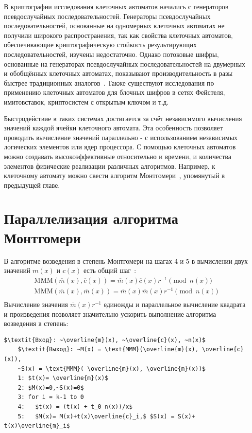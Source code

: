 \documentclass[times,specification,annotation]{itmo-student-thesis}
\begin{document}
В криптографии исследования клеточных автоматов начались с генераторов псевдослучайных последовательностей.
Генераторы псевдослучайных последовательностей, основанные на одномерных клеточных автоматах не получили широкого распространения,
так как свойства клеточных автоматов, обеспечивающие криптографическую стойкость результирующих последовательностей,
изучены недостаточно.
Однако потоковые шифры, основанные на генераторах псевдослучайных последовательностей на двумерных и обобщённых
клеточных автоматах, показывают производительность в разы быстрее традиционных аналогов~\cite{zhu17_2}.
Также существуют исследования по применению клеточных автоматов для блочных шифров в сетях Фейстеля, имитовставок,
криптосистем с открытым ключом и т.д.

Быстродействие в таких системах достигается за счёт независимого вычисления значений каждой ячейки клеточного автомата.
Эта особенность позволяет проводить вычисление значений параллельно - с использованием независимых логических элементов или ядер процессора.
С помощью клеточных автоматов можно создавать высокоэффективные относительно и времени, и количества элементов физические реализации различных алгоритмов.
Например, к клеточному автомату можно свести алгоритм Монтгомери~\cite{jeo07}, упомянутый в предыдущей главе.

\section{Параллелизация алгоритма Монтгомери}\label{sec:paramont}

В алгоритме возведения в степень Монтгомери на шагах 4 и 5 в вычислении двух значений
$m(x)$ и $c(x)$ есть общий шаг~\cite{ku04}:
\begin{gather*}
  \text{MMM}(\overline{m}(x), \overline{c}(x)) = \overline{m}(x)\overline{c}(x)r^{-1} \pmod{n(x)}\\
  \text{MMM}(\overline{m}(x), \overline{m}(x)) = \overline{m}(x)\overline{m}(x)r^{-1} \pmod{n(x)}\\
\end{gather*}
Вычисление значения $\overline{m}(x)r^{-1}$ единожды и параллельное вычисление квадрата и произведения
позволяет значительно ускорить выполнение алгоритма возведения в степень:
\begin{lstlisting}[breaklines=true, mathescape=true]
    $\textit{Вход}: ~\overline{m}(x), ~\overline{c}(x), ~n(x)$
    $\textit{Выход}: ~M(x) = \text{MMM}(\overline{m}(x), \overline{c}(x)),
    ~S(x) = \text{MMM}( \overline{m}(x), \overline{m}(x))$
    1: $t(x)= \overline{m}(x)$
    2: $M(x)=0,~S(x)=0$
    3: for i = k-1 to 0
    4:   $t(x) = (t(x) + t_0 n(x))/x$
    5:   $M(x)= M(x)+t(x)\overline{c}_i,$ $S(x) = S(x)+ t(x)\overline{m}_i$
\end{lstlisting}
\end{document}
